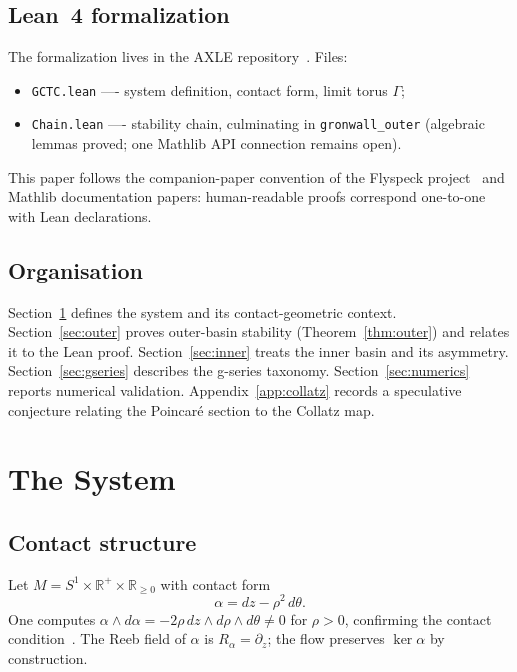 \documentclass[12pt]{amsart}
\theoremstyle{definition}
\theoremstyle{remark}
\newcommand{\R}{\mathbb{R}}
\newcommand{\lean}[1]{\texttt{#1}}
\begin{document}
\subsection*{Lean~4 formalization}

The formalization lives in the AXLE repository~\cite{AXLE2026}.
Files:
\begin{itemize}
  \item \texttt{GCTC.lean} ---- system definition, contact form,
        limit torus $\Gamma$;
  \item \texttt{Chain.lean} ---- stability chain, culminating in
        \lean{gronwall\_outer} (algebraic lemmas proved; one
        Mathlib API connection remains open).
\end{itemize}
This paper follows the companion-paper convention of the
Flyspeck project~\cite{Hales2015} and Mathlib documentation
papers: human-readable proofs correspond one-to-one with
Lean declarations.

\subsection*{Organisation}

Section~\ref{sec:system} defines the system and its
contact-geometric context.
Section~\ref{sec:outer} proves outer-basin stability
(Theorem~\ref{thm:outer}) and relates it to the Lean proof.
Section~\ref{sec:inner} treats the inner basin and its
asymmetry.
Section~\ref{sec:gseries} describes the g-series taxonomy.
Section~\ref{sec:numerics} reports numerical validation.
Appendix~\ref{app:collatz} records a speculative conjecture
relating the Poincar\'{e} section to the Collatz map.

\section{The System}\label{sec:system}

\subsection{Contact structure}

Let $M=S^{1}\times\R^{+}\times\R_{\ge 0}$ with contact form
\[
  \alpha = dz - \rho^{2}\,d\theta.
\]
One computes
$\alpha\wedge d\alpha = -2\rho\,dz\wedge d\rho\wedge d\theta\ne 0$
for $\rho>0$, confirming the contact condition~\cite{Etnyre2003}.
The Reeb field of $\alpha$ is $R_\alpha=\partial_z$; the
flow preserves $\ker\alpha$ by construction.
\end{document}
